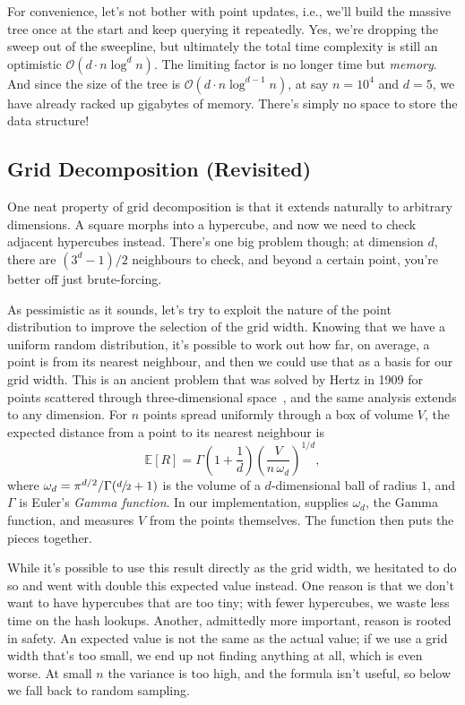 For convenience, let's not bother with point updates, i.e., we'll build the massive
tree once at the start and keep querying it repeatedly. Yes, we're dropping the sweep
out of the sweepline, but ultimately the total time complexity is still an optimistic
$\mathcal{O}(d \cdot n \log^{d} n)$. The limiting factor is no longer time but \textit{memory}. And
since the size of the tree is $\mathcal{O}(d \cdot n \log^{d - 1} n)$, at say $n = 10^{4}$ and
$d = 5$, we have already racked up gigabytes of memory. There's simply no space to
store the data structure!

\subsection{Grid Decomposition (Revisited)}

One neat property of grid decomposition is that it extends naturally to arbitrary dimensions.
A square morphs into a hypercube, and now we need to check adjacent hypercubes instead. There's
one big problem though; at dimension $d$, there are $(3^{d} - 1)/2$ neighbours to check, and
beyond a certain point, you're better off just brute-forcing.

As pessimistic as it sounds, let's try to exploit the nature of the point distribution to
improve the selection of the grid width. Knowing that we have a uniform random distribution,
it's possible to work out how far, on average, a point is from its nearest neighbour, and then
we could use that as a basis for our grid width. This is an ancient problem that was solved
by Hertz in 1909 for points scattered through three-dimensional space~\cite{hertz1909}, and the
same analysis extends to any dimension. For $n$ points spread uniformly through a box of volume $V$, the
expected distance from a point to its nearest neighbour is
\[
    \mathbb{E}[R] = \Gamma\!\left(1 + \frac{1}{d}\right) \left(\frac{V}{n \, \omega_{d}}\right)^{1/d},
\]
where $\omega_{d} = \pi^{d/2} / \Gamma(\sfrac{d}{2} + 1)$ is the volume of a $d$-dimensional ball of
radius $1$, and $\Gamma$ is Euler's \textit{Gamma function}. In our implementation,
 supplies $\omega_{d}$,  the Gamma
function, and  measures $V$ from the points themselves.
The function  then puts
the pieces together.

While it's possible to use this result directly as the grid width, we hesitated to do so and
went with double this expected value instead. One reason is that we don't want to have hypercubes that
are too tiny; with fewer hypercubes, we waste less time on the hash lookups. Another, admittedly
more important, reason is rooted in safety. An expected value is not the same as the actual value;
if we use a grid width that's too small, we end up not finding anything at all, which is even worse.
At small $n$ the variance is too high, and the formula isn't useful, so below
 we fall back to random sampling.

